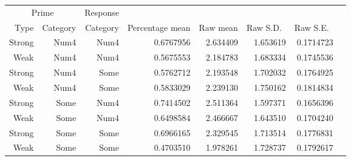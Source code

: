 \documentclass[10pt]{article}
\begin{document}
\begin{table*}[ht]
  \centering
  \begin{tabular}{rrr|rrrrr}
    \hline
    \multicolumn{2}{c}{Prime} & Response & & & & \\
    Type & Category & Category  & Percentage mean & Raw mean & Raw S.D.\ & Raw S.E.\ \\
    \hline
 Strong & Num4 &  Num4 &   0.6767956 &  2.634409 & 1.653619 & 0.1714723     \\
   Weak & Num4 &  Num4 &   0.5675553 &  2.184783 & 1.683334 & 0.1745536     \\
 Strong & Num4 &  Some &   0.5762712 &  2.193548 & 1.702032 & 0.1764925     \\
   Weak & Num4 &  Some &   0.5833029 &  2.239130 & 1.750162 & 0.1814834     \\
 Strong & Some &  Num4 &   0.7414502 &  2.511364 & 1.597371 & 0.1656396     \\
   Weak & Some &  Num4 &   0.6498584 &  2.466667 & 1.643510 & 0.1704240     \\
 Strong & Some &  Some &   0.6966165 &  2.329545 & 1.713514 & 0.1776831     \\
    Weak & Some &  Some &   0.4703510 &  1.978261 & 1.728737 & 0.1792617     \\
    \hline
  \end{tabular}
\end{table*}
\end{document}
